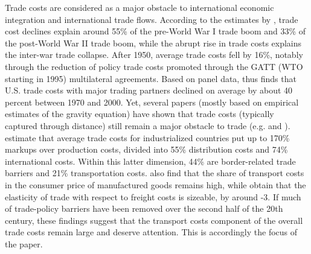 \documentclass[a4paper,11pt]{article}
\begin{document}
Trade costs are considered as a major obstacle to international economic integration and international trade flows. According to the estimates by \citet{Jacks08}, trade cost declines explain around 55\% of the pre-World War I trade boom and 33\% of the post-World War II trade boom, while the abrupt rise in trade costs explains the inter-war trade collapse. After 1950, average trade costs fell by 16\%, notably through the reduction of policy trade costs promoted through the GATT (WTO starting in 1995) multilateral agreements. Based on panel data, \citet{novy13} thus finds  that U.S. trade costs with major trading partners declined on average by about 40 percent between 1970 and 2000. Yet, several papers (mostly based on empirical estimates of the gravity equation) have shown that trade costs (typically captured through distance) still remain a major obstacle to trade (e.g. \citealp{Head_Mayer04} and \citealp{Disdier_Head08}). \citet{anderson_wincoop_jel} estimate that average trade costs for industrialized countries put up to 170\% markups over production costs, divided into 55\% distribution costs and 74\% international costs. Within this latter dimension, 44\% are border-related trade barriers and 21\% transportation costs. \citet{Lafourcade_Thisse} also find that the share of transport costs in the consumer price of manufactured goods remains high, while \citet{Behar_Venables} obtain that the elasticity of trade with respect to freight costs is sizeable, by around -3. If much of trade-policy barriers have been removed over the second half of the 20th century, these findings suggest that the transport costs component of the overall trade costs remain large and deserve attention. This is accordingly the focus of the paper.\smallskip
\end{document}
